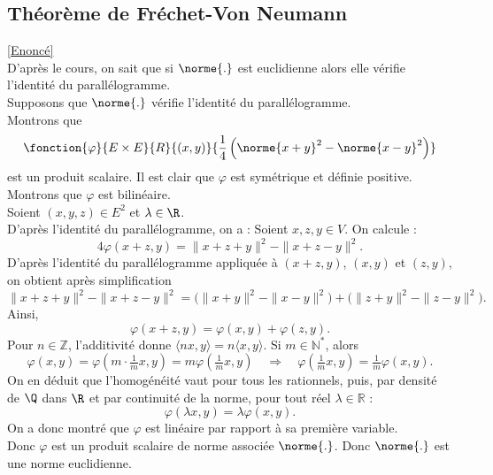 \documentclass{book}
\begin{document}
	\subsection{Théorème de Fréchet-Von Neumann}\label{sec:theoreme-de-frechet-von-neumann}
		\textcolor{blue}{\hyperref[Théorème de Fréchet-Von Neumann-Jordan]{[Enoncé]}}\\
	D'après le cours, on sait que si $\norme{.}$ est euclidienne alors elle vérifie l'identité du parallélogramme.\\
	Supposons que $\norme{.}$ vérifie l'identité du parallélogramme.\\
	Montrons que \[\fonction{\varphi}{E\times E}{R}{(x,y)}{\dfrac{1}{4}\left(\norme{x+y}^2-\norme{x-y}^2\right)}\] est un produit scalaire.
	Il est clair que $\varphi$ est symétrique et définie positive.\\
	Montrons que $\varphi$ est bilinéaire.\\
	Soient $(x,y,z)\in E^2$ et $\lambda\in\R$.\\
	D'après l'identité du parallélogramme, on a : 
	Soient $x,z,y \in V$. On calcule :
	\[
	4\varphi(x+z,y) = \|x+z+y\|^2 - \|x+z-y\|^2.
	\]
	D’après l’identité du parallélogramme appliquée à $(x+z,y)$, $(x,y)$ et $(z,y)$, 
	on obtient après simplification
	\[
	\|x+z+y\|^2 - \|x+z-y\|^2 
	= \big(\|x+y\|^2 - \|x-y\|^2\big) 
	+ \big(\|z+y\|^2 - \|z-y\|^2\big).
	\]
	Ainsi,
	\[
	\varphi(x+z,y) = \varphi(x,y) + \varphi(z,y).
	\]
	Pour $n\in\mathbb{Z}$, l’additivité donne 
	$\langle n x,y\rangle = n\langle x,y\rangle$.  
	Si $m\in\mathbb{N}^\ast$, alors
	\[
	\varphi(x,y) = \varphi(m\cdot \tfrac{1}{m}x, y) 
	= m \varphi( \tfrac{1}{m}x, y)
	\quad\Rightarrow\quad
	\varphi(\tfrac{1}{m}x, y) = \tfrac{1}{m}\varphi(x,y).
	\]
	On en déduit que l’homogénéité vaut pour tous les rationnels, puis, par densité de $\Q$ dans $\R$ et par continuité de la norme, pour tout réel $\lambda\in\mathbb{R}$ :
	\[
	\varphi(\lambda x, y) = \lambda \varphi(x,y).
	\]
	On a donc montré que $\varphi$ est linéaire par rapport à sa première variable. \\
	Donc $\varphi$ est un produit scalaire de norme associée $\norme{.}$. Donc $\norme{.}$ est une norme euclidienne.
\end{document}
